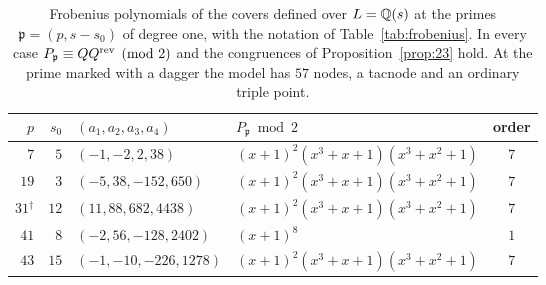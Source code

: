 \begin{table}[ht]
\centering\footnotesize
\begin{tabular}{@{}rrllc@{}}
\toprule
$p$ & $s_0$ & $(a_1,a_2,a_3,a_4)$ & $P_{\mathfrak p} \bmod 2$ & order\\
\midrule
$7$ & $5$ & $(-1, -2, 2, 38)$ & $(x+1)^{2}(x^{3}+x+1)(x^{3}+x^{2}+1)$ & $7$\\
$19$ & $3$ & $(-5, 38, -152, 650)$ & $(x+1)^{2}(x^{3}+x+1)(x^{3}+x^{2}+1)$ & $7$\\
$31$$^\dagger$ & $12$ & $(11, 88, 682, 4438)$ & $(x+1)^{2}(x^{3}+x+1)(x^{3}+x^{2}+1)$ & $7$\\
$41$ & $8$ & $(-2, 56, -128, 2402)$ & $(x+1)^{8}$ & $1$\\
$43$ & $15$ & $(-1, -10, -226, 1278)$ & $(x+1)^{2}(x^{3}+x+1)(x^{3}+x^{2}+1)$ & $7$\\
\bottomrule
\end{tabular}
\caption{Frobenius polynomials of the covers defined over $L=\mathbb{Q}(s)$ at the primes $\mathfrak p=(p,s-s_0)$ of degree one, with the notation of Table~\ref{tab:frobenius}. In every case $P_{\mathfrak p}\equiv QQ^{\mathrm{rev}}\pmod 2$ and the congruences of Proposition~\ref{prop:23} hold. At the prime marked with a dagger the model has $57$ nodes, a tacnode and an ordinary triple point.}
\label{tab:lcovers}
\end{table}
